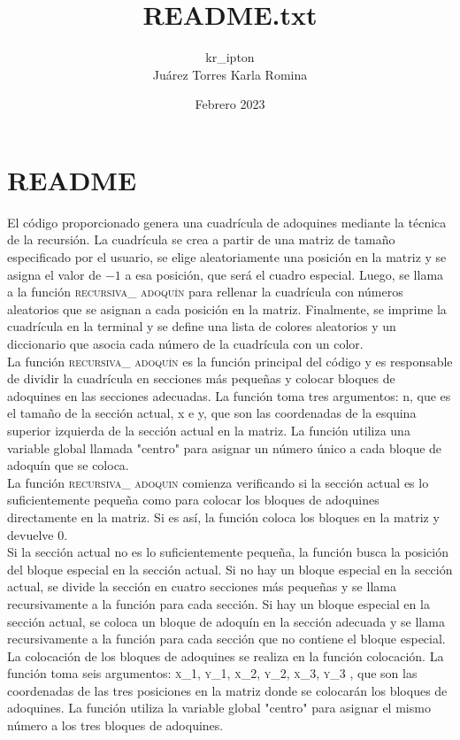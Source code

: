 \documentclass{article}
\title{README.txt}
\author{kr\_ipton\\
Juárez Torres Karla Romina}
\date{Febrero 2023}
\begin{document}
\maketitle

\section{README}
El código proporcionado genera una cuadrícula de adoquines mediante la técnica de la recursión.
La cuadrícula se crea a partir de una matriz de tamaño especificado por el usuario, se elige aleatoriamente una posición en la matriz y se asigna el valor de $-1$ a esa posición,
que será el cuadro especial. Luego, se llama a la función \textsc{recursiva\_ adoquín }
para rellenar la cuadrícula con números aleatorios que se asignan a cada posición en la matriz. Finalmente, se imprime la cuadrícula en la terminal y se define una lista de colores aleatorios y
un diccionario que asocia cada número de la cuadrícula con un color.\\

La función \textsc{recursiva\_ adoquín } es la función principal del código y es responsable de dividir la cuadrícula en secciones más pequeñas y
colocar bloques de adoquines en las secciones adecuadas. La función toma tres argumentos: n, que es el tamaño de la sección actual, x e y,
que son las coordenadas de la esquina superior izquierda de la sección actual en la matriz. La función utiliza una variable global llamada "centro"
para asignar un número único a cada bloque de adoquín que se coloca.\\

La función \textsc{recursiva\_ adoquin } comienza verificando si la sección actual es lo suficientemente pequeña como para colocar los bloques de adoquines directamente en la matriz.
Si es así, la función coloca los bloques en la matriz y devuelve 0.\\

Si la sección actual no es lo suficientemente pequeña, la función busca la posición del bloque especial en la sección actual.
Si no hay un bloque especial en la sección actual, se divide la sección en cuatro secciones más pequeñas y se llama recursivamente a la función para cada sección.
Si hay un bloque especial en la sección actual, se coloca un bloque de adoquín en la sección adecuada y se llama recursivamente a la función para cada sección que no contiene el bloque especial.\\

La colocación de los bloques de adoquines se realiza en la función colocación. La función toma seis argumentos: \textsc{x\_1, y\_1, x\_2, y\_2, x\_3, y\_3 },
que son las coordenadas de las tres posiciones en la matriz donde se colocarán los bloques de adoquines. La función utiliza la variable global "centro"
para asignar el mismo número a los tres bloques de adoquines.\\
\end{document}
